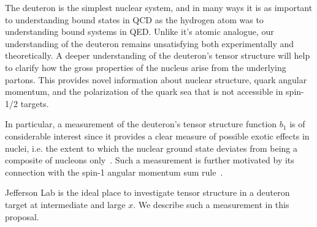 The deuteron is the simplest nuclear system, and in many ways it is as important to understanding bound states in QCD as the hydrogen atom was to understanding bound systems in QED.  Unlike it's atomic analogue, our understanding of the deuteron remains unsatisfying both experimentally and theoretically.  
A deeper understanding of the deuteron's tensor structure will help to clarify how the gross properties of the nucleus arise from the 
underlying partons.  This provides novel information about
nuclear structure, quark angular momentum, and the polarization of the quark sea  that is not accessible in spin-1/2 targets.  


In particular, a measurement of the deuteron's tensor structure function $b_1$ is of considerable interest since it provides a clear measure of possible exotic effects in nuclei, i.e. the extent to which the nuclear ground state deviates from being a composite of nucleons only~\cite{Khan:1991qk}.  Such a measurement is further motivated by its connection with the spin-1 angular momentum sum rule~\cite{Taneja:2011sy}.

Jefferson Lab is the ideal place to investigate
tensor structure in a deuteron target
at intermediate and large $x$.  We describe such a measurement in this proposal.
